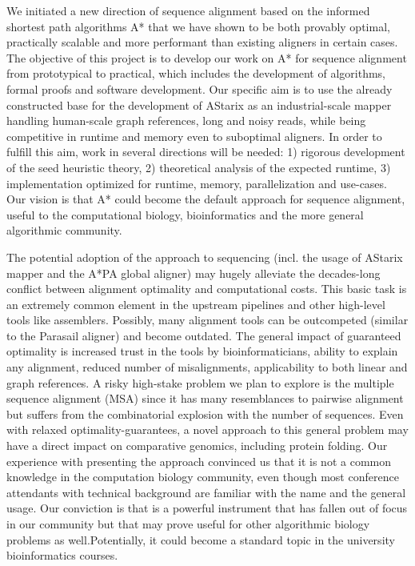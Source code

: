We initiated a new direction of sequence alignment based on the informed
shortest path algorithms A* that we have shown to be both provably optimal,
practically scalable and more performant than existing aligners in certain
cases. The objective of this project is to develop our work on A* for sequence
alignment from prototypical to practical, which includes the development of
algorithms, formal proofs and software development. Our specific aim is to use
the already constructed base for the development of AStarix as an
industrial-scale mapper handling human-scale graph references, long and noisy
reads, while being competitive in runtime and memory even to suboptimal
aligners. In order to fulfill this aim, work in several directions will be
needed: 1) rigorous development of the seed heuristic theory, 2) theoretical
analysis of the expected runtime, 3) implementation optimized for runtime,
memory, parallelization and use-cases. Our vision is that A* could become the
default approach for sequence alignment, useful to the computational biology,
bioinformatics and the more general algorithmic community.

The potential adoption of the \A approach to sequencing (incl. the usage of
AStarix mapper and the A*PA global aligner) may hugely alleviate the
decades-long conflict between alignment optimality and computational costs. This
basic task is an extremely common element in the upstream pipelines and other
high-level tools like assemblers. Possibly, many alignment tools can be
outcompeted (similar to the Parasail aligner) and become outdated. The general
impact of guaranteed optimality is increased trust in the tools by
bioinformaticians, ability to explain any alignment, reduced number of
misalignments, applicability to both linear and graph references. A risky
high-stake problem we plan to explore is the multiple sequence alignment (MSA)
since it has many resemblances to pairwise alignment but suffers from the
combinatorial explosion with the number of sequences. Even with relaxed
optimality-guarantees, a novel approach to this general problem may have a
direct impact on comparative genomics, including protein folding. Our experience
with presenting the \A approach convinced us that it is not a common knowledge
in the computation biology community, even though most conference attendants
with technical background are familiar with the name and the general usage. Our
conviction is that \A is a powerful instrument that has fallen out of focus in
our community but that may prove useful for other algorithmic biology problems
as well.Potentially, it could become a standard topic in the university
bioinformatics courses.

